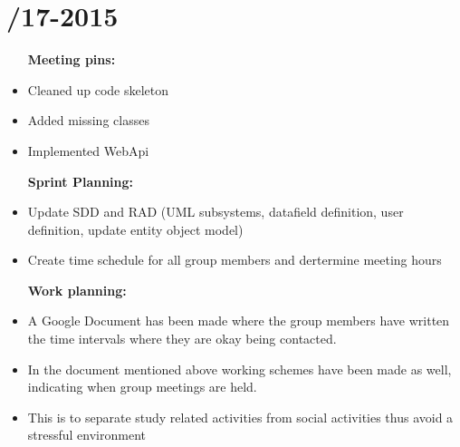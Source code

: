 \section{/17-2015} %
\attend{\at}{\nat}{\at}{\at}


\begin{itemize}
	\item [\textbf{Meeting pins:}]
	\item Cleaned up code skeleton
	\item Added missing classes
	\item Implemented WebApi
\end{itemize}

\begin{itemize}
	\item [\textbf{Sprint Planning:}]
	\item Update SDD and RAD (UML subsystems, datafield definition, user definition, update entity object model)
	\item Create time schedule for all group members and dertermine meeting hours
\end{itemize}

\begin{itemize}
	\item [\textbf{Work planning:}]
	\item A Google Document has been made where the group members have written the time intervals where they are okay being contacted.
	\item In the document mentioned above working schemes have been made as well, indicating when group meetings are held. 
	\item This is to separate study related activities from social activities thus avoid a stressful environment
\end{itemize}